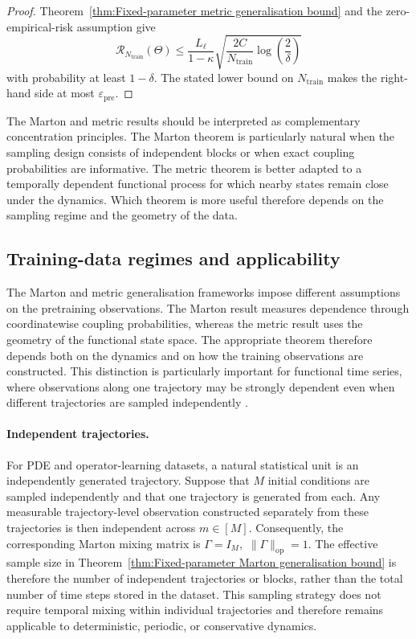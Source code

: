 \begin{proof}
Theorem~\ref{thm:Fixed-parameter metric generalisation bound} and the zero-empirical-risk assumption give
\[
\mathcal R_{N_{\mathrm{train}}}(\Theta)
\leqslant
\frac{L_\ell}{1-\kappa}
\sqrt{
\frac{2C}{N_{\mathrm{train}}}
\log\left(\frac2\delta\right)
}
\]
with probability at least \(1-\delta\). The stated lower bound on \(N_{\mathrm{train}}\) makes the right-hand side at most \(\varepsilon_{\mathrm{pre}}\).
\end{proof}

The Marton and metric results should be interpreted as complementary concentration principles. The Marton theorem is particularly natural when the sampling design consists of independent blocks or when exact coupling probabilities are informative. The metric theorem is better adapted to a temporally dependent functional process for which nearby states remain close under the dynamics. Which theorem is more useful therefore depends on the sampling regime and the geometry of the data.

\subsection{Training-data regimes and applicability}
\label{subsec:Training-data regimes}

The Marton and metric generalisation frameworks impose different assumptions on the pretraining observations. The Marton result measures dependence through coordinatewise coupling probabilities, whereas the metric result uses the geometry of the functional state space. The appropriate theorem therefore depends both on the dynamics and on how the training observations are constructed. This distinction is particularly important for functional time series, where observations along one trajectory may be strongly dependent even when different trajectories are sampled independently \cite{HormannKokoszka2010,AueEtAl2015}.

\paragraph{Independent trajectories.}

For PDE and operator-learning datasets, a natural statistical unit is an independently generated trajectory. Suppose that \(M\) initial conditions are sampled independently and that one trajectory is generated from each. Any measurable trajectory-level observation constructed separately from these trajectories is then independent across \(m\in[M]\). Consequently, the corresponding Marton mixing matrix is
\(
\Gamma=I_M,
\)
\(
\|\Gamma\|_{\mathrm{op}}=1.
\)
The effective sample size in Theorem~\ref{thm:Fixed-parameter Marton generalisation bound} is therefore the number of independent trajectories or blocks, rather than the total number of time steps stored in the dataset.
This sampling strategy does not require temporal mixing within individual trajectories and therefore remains applicable to deterministic, periodic, or conservative dynamics.

